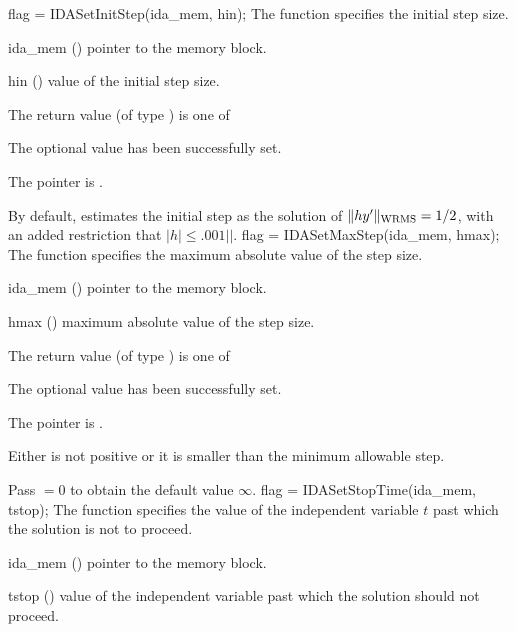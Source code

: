 {
flag = IDASetInitStep(ida\_mem, hin);
}
{
  The function  specifies the initial step size.
}
{
  \begin{args}
  \item[ida\_mem] ()
    pointer to the {\ida} memory block.
  \item[hin] ()
    value of the initial step size.
  \end{args}
}
{
  The return value  (of type ) is one of
  \begin{args}
  \item[\Id{IDA\_SUCCESS}] 
    The optional value has been successfully set.
  \item[\Id{IDA\_MEM\_NULL}]
    The  pointer is .
  \end{args}
}
{
  By default, {\ida} estimates the initial step as the solution of 
  $\|h y' \|_{\mbox{\scriptsize WRMS}} = 1/2$, with an added restriction
  that $|h| \leq .001|$$|$.
}
{
flag = IDASetMaxStep(ida\_mem, hmax);
}
{
  The function  specifies the maximum absolute
  value of the step size.
}
{
  \begin{args}
  \item[ida\_mem] ()
    pointer to the {\ida} memory block.
  \item[hmax] ()
    maximum absolute value of the step size.
  \end{args}
}
{
  The return value  (of type ) is one of
  \begin{args}
  \item[\Id{IDA\_SUCCESS}] 
    The optional value has been successfully set.
  \item[\Id{IDA\_MEM\_NULL}]
    The  pointer is .
  \item[\Id{IDA\_ILL\_INPUT}]
    Either  is not positive or it is smaller than the minimum allowable step.
  \end{args}
}
{
  Pass $=0$ to obtain the default value $\infty$.
}
{
flag = IDASetStopTime(ida\_mem, tstop);
}
{
  The function  specifies the value of the
  independent variable $t$ past which the solution is not to proceed.
}
{
  \begin{args}
  \item[ida\_mem] ()
    pointer to the {\ida} memory block.
  \item[tstop] ()
    value of the independent variable past which the solution should
    not proceed.
  \end{args}
}

